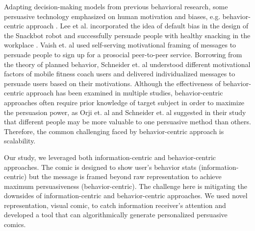 Adapting decision-making models from previous behavioral research, some persuasive technology emphasized on human motivation and biases, e.g. behavior-centric approach \cite{LeeKF11}. Lee et al. incorporated the idea of default bias in the design of the Snackbot robot and successfully persuade people with healthy snacking in the workplace \cite{LeeKF11}. Vaish et. al used self-serving motivational framing of messages to persuade people to sign up for a prosocial peer-to-peer service\cite{vaish2018s}. Borrowing from the theory of planned behavior, Schneider et. al understood different motivational factors of mobile fitness coach users and delivered individualized messages to persuade users based on their motivations\cite{schneider2016understanding}. Although the effectiveness of behavior-centric approach has been examined in multiple studies, behavior-centric approaches often require prior knowledge of target subject in order to maximize the persuasion power, as Orji et. al and Schneider et. al suggested in their study that different people may be more valuable to one persuasive method than others\cite{schneider2016understanding,orji2014developing}. Therefore, the common challenging faced by behavior-centric approach is scalability.\par
Our study, we leveraged both information-centric and behavior-centric approaches. The comic is designed to show user's behavior stats (information-centric) but the message is framed beyond raw representation to achieve maximum persuasiveness (behavior-centric). The challenge here is mitigating the downsides of information-centric and behavior-centric approaches. We used novel representation, visual comic, to catch information receiver's attention and developed a tool that can algorithmically generate personalized persuasive comics.

